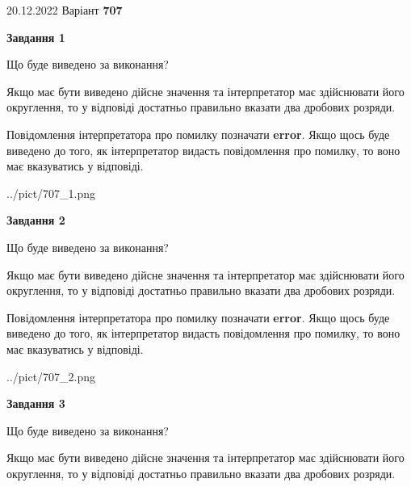 \documentclass[12pt, ukrainian]{article}
\begin{document}
{20.12.2022 Варіант \No \textbf { 707 }\par}
{
\begin {Large}

{\begin {center}\textbf{Завдання 1}\end {center}}\par
Що буде виведено за виконання? \par

Якщо має бути виведено дійсне значення та інтерпретатор має здійснювати його округлення, 
то у відповіді достатньо правильно вказати два дробових розряди.

Повідомлення інтерпретатора про помилку позначати \textbf{error}.
Якщо щось буде виведено до того, як інтерпретатор видасть повідомлення про помилку, 
то воно має вказуватись у відповіді. \par

\begin{center}
	{../pict/707_1.png}
\end{center}
\newpage

{\begin {center}\textbf{Завдання 2}\end {center}}\par
Що буде виведено за виконання? \par

Якщо має бути виведено дійсне значення та інтерпретатор має здійснювати його округлення, 
то у відповіді достатньо правильно вказати два дробових розряди.

Повідомлення інтерпретатора про помилку позначати \textbf{error}.
Якщо щось буде виведено до того, як інтерпретатор видасть повідомлення про помилку, 
то воно має вказуватись у відповіді. \par

\begin{center}
	{../pict/707_2.png}
\end{center}
\newpage

{\begin {center}\textbf{Завдання 3}\end {center}}\par
Що буде виведено за виконання? \par

Якщо має бути виведено дійсне значення та інтерпретатор має здійснювати його округлення, 
то у відповіді достатньо правильно вказати два дробових розряди.


\end{Large}}
\end{document}
